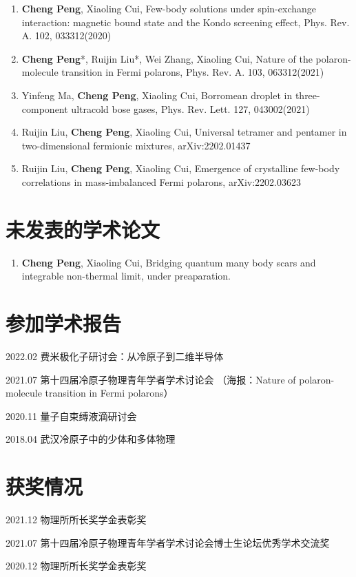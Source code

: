 {
\setlist[enumerate]{}%

\begin{enumerate}[nosep]
    \item {\bfseries\sffamily Cheng Peng}, Xiaoling Cui, Few-body solutions under spin-exchange interaction: magnetic bound state and the Kondo screening effect, Phys. Rev. A. 102, 033312(2020)
    
    \item {\bfseries\sffamily Cheng Peng}*, Ruijin Liu*, Wei Zhang, Xiaoling Cui, Nature of the polaron-molecule transition in Fermi polarons, Phys. Rev. A. 103, 063312(2021)

    \item Yinfeng Ma, {\bfseries\sffamily Cheng Peng}, Xiaoling Cui, Borromean droplet in three-component ultracold bose gases, Phys. Rev. Lett. 127, 043002(2021)

    \item Ruijin Liu, {\bfseries\sffamily Cheng Peng}, Xiaoling Cui, Universal tetramer and pentamer in two-dimensional fermionic mixtures, arXiv:2202.01437

    \item Ruijin Liu, {\bfseries\sffamily Cheng Peng}, Xiaoling Cui, Emergence of crystalline few-body correlations in mass-imbalanced Fermi polarons, arXiv:2202.03623
\end{enumerate}
}


\section*{未发表的学术论文}

{
\setlist[enumerate]{}%

\begin{enumerate}[nosep]
    \item {\bfseries\sffamily Cheng Peng}, Xiaoling Cui, Bridging quantum many body scars and integrable non-thermal limit, under preaparation.
\end{enumerate}
}



\section*{参加学术报告}

2022.02 费米极化子研讨会：从冷原子到二维半导体

2021.07 第十四届冷原子物理青年学者学术讨论会 （海报：Nature of polaron-molecule transition in Fermi polarons）

2020.11 量子自束缚液滴研讨会

2018.04 武汉冷原子中的少体和多体物理


\section*{获奖情况}

2021.12 物理所所长奖学金表彰奖

2021.07 第十四届冷原子物理青年学者学术讨论会博士生论坛优秀学术交流奖

2020.12 物理所所长奖学金表彰奖



\cleardoublepage[plain]%
